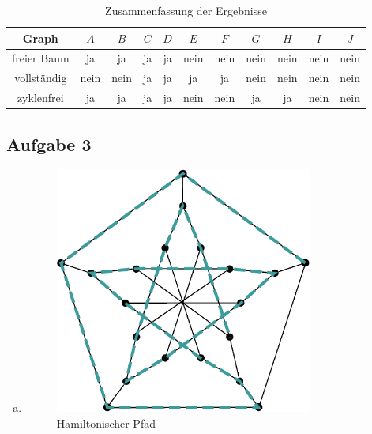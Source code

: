 \documentclass[11pt]{article}
\begin{document}
\begin{table}[h!]
  \centering
  \begin{tabular}{|c|c|c|c|c|c|c|c|c|c|c|}
    \hline
    Graph & $A$ & $B$ & $C$ & $D$ & $E$ & $F$ & $G$ & $H$ & $I$ & $J$ \\
    \hline
    freier Baum & ja & ja & ja & ja & nein & nein & nein & nein & nein & nein \\
    \hline
    vollständig & nein & nein & ja & ja & ja & ja & nein & nein & nein & nein \\
    \hline
    zyklenfrei & ja & ja & ja & ja & nein & nein & ja & ja & nein & nein \\
    \hline
  \end{tabular}
  \caption{Zusammenfassung der Ergebnisse}
  \label{tab:table_a2}
\end{table}

\subsection*{Aufgabe 3}
\begin{enumerate}[a)]
  \item 
    \begin{figure}[h!]
      \centering
      \includegraphics[width=0.8\textwidth]{hamilton_graph}
      \caption{Hamiltonischer Pfad}
      \label{fig:hamilton_graph}
    \end{figure}
    
\end{enumerate} 
\end{document}
